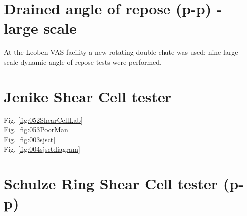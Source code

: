 \section{Drained angle of repose (p-p) - large scale}
\label{sec:aorlargescale}

At the Leoben VAS facility a new rotating double chute was used: 
nine large scale dynamic angle of repose tests were performed. 

\section{Jenike Shear Cell tester}
\label{sec:jsct}

Fig. \ref{fig:052ShearCellLab} \\
Fig. \ref{fig:053PoorMan} \\
Fig. \ref{fig:003sjsct} \\

Fig. \ref{fig:004sjsctdiagram} \\


\section{Schulze Ring Shear Cell tester (p-p)}
\label{sec:SRSCT}



